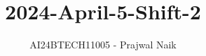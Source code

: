 \documentclass[journal]{IEEEtran}
\begin{document}

\vspace{3cm}

\title{2024-April-5-Shift-2}
\author{AI24BTECH11005 - Prajwal Naik}
{\let\newpage\relax\maketitle}

\renewcommand{\thefigure}{\theenumi}
\renewcommand{\thetable}{\theenumi}
\setlength{\intextsep}{10pt} %


\renewcommand{\thetable}{\theenumi}
\end{document}
